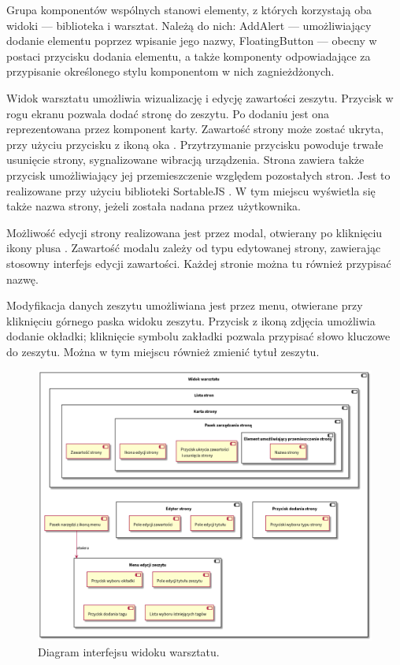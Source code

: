 Grupa komponentów wspólnych stanowi elementy, z których korzystają oba widoki — biblioteka i warsztat. Należą do nich:
AddAlert — umożliwiający dodanie elementu poprzez wpisanie jego nazwy, FloatingButton — obecny w postaci przycisku dodania elementu,
a także komponenty odpowiadające za przypisanie określonego stylu komponentom w nich zagnieżdżonych.

Widok warsztatu umożliwia wizualizację i edycję zawartości zeszytu. Przycisk w rogu ekranu pozwala dodać stronę do zeszytu.
Po dodaniu jest ona reprezentowana przez komponent karty. Zawartość strony może zostać ukryta,
przy użyciu przycisku z ikoną oka \cite{ionic}. Przytrzymanie przycisku powoduje trwałe usunięcie strony, sygnalizowane wibracją urządzenia.
Strona zawiera także przycisk umożliwiający jej przemieszczenie względem pozostałych stron. Jest to realizowane przy użyciu
biblioteki SortableJS \cite{sortablejs}.
W tym miejscu wyświetla się także nazwa
strony, jeżeli została nadana przez użytkownika.

Możliwość edycji strony realizowana jest przez modal, otwierany po kliknięciu ikony plusa \cite{ionic}. Zawartość modalu zależy od
typu edytowanej strony, zawierając stosowny interfejs edycji zawartości. Każdej stronie można tu również przypisać nazwę.

Modyfikacja danych zeszytu umożliwiana jest przez menu, otwierane przy kliknięciu górnego paska widoku zeszytu.
Przycisk z ikoną zdjęcia \cite{ionic} umożliwia dodanie okładki; kliknięcie symbolu zakładki pozwala przypisać słowo kluczowe
do zeszytu. Można w tym miejscu również zmienić tytuł zeszytu.

\begin{figure}[H]
	\begin{center}
		\includegraphics[scale=0.405]{media/WorkshopInterface.png}
	\end{center}
	\caption{Diagram interfejsu widoku warsztatu.}
	\label{rys:workshop-interface}
\end{figure}

